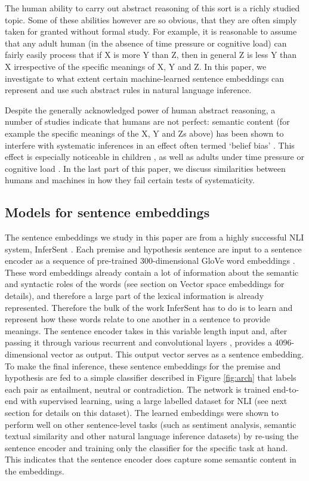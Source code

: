 The human ability to carry out abstract reasoning of this sort is a richly studied topic. Some of these abilities however are so obvious, that they are often simply taken for granted without formal study. For example, it is reasonable to assume that any adult human (in the absence of time pressure or cognitive load) can fairly easily process that if X is more Y than Z, then in general Z is less Y than X irrespective of the specific meanings of X, Y and Z. In this paper, we investigate to what extent certain machine-learned sentence embeddings can represent and use such abstract rules in natural language inference.

Despite the generally acknowledged power of human abstract reasoning, a number of studies indicate that humans are not perfect: semantic content (for example the specific meanings of the X, Y and Zs above) has been shown to interfere with systematic inferences in an effect often termed `belief bias' \citep{braine1978relation,johnson1978psychology}. This effect is especially noticeable in children \citep{evans1995belief}, as well as adults under time pressure or cognitive load \citep{evans2013psychology}. In the last part of this paper, we discuss similarities between humans and machines in how they fail certain tests of systematicity.

\subsection{Models for sentence embeddings}
The sentence embeddings we study in this paper are from a highly successful NLI system, InferSent \citep{Conneau:2017uf}. Each premise and hypothesis sentence are input to a sentence encoder as a sequence of pre-trained 300-dimensional GloVe word embeddings \citep{pennington14}. These word embeddings already contain a lot of information about the semantic and syntactic roles of the words (see section on Vector space embeddings for details), and therefore a large part of the lexical information is already represented. Therefore the bulk of the work InferSent has to do is to learn and represent how these words relate to one another in a sentence to provide meanings. The sentence encoder takes in this variable length input and, after passing it through various recurrent and convolutional layers \cite[see][for details]{Conneau:2017uf}, provides a 4096-dimensional vector as output. This output vector serves as a sentence embedding. To make the final inference, these sentence embeddings for the premise and hypothesis are fed to a simple classifier described in Figure \ref{fig:arch} that labels each pair as entailment, neutral or contradiction. The network is trained end-to-end with supervised learning, using a large labelled dataset for NLI (see next section for details on this dataset). The learned embeddings were shown to perform well on other sentence-level tasks (such as sentiment analysis, semantic textual similarity and other natural language inference datasets) by re-using the sentence encoder and training only the classifier for the specific task at hand. This indicates that the sentence encoder does capture some semantic content in the embeddings.

